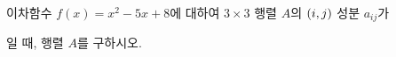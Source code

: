 이차함수 $f(x)=x^2-5x+8$에 대하여 $3\times 3$ 행렬 $A$의 $(i{,}\mkern3mu\mathopen{}j)$ 성분 $a_{ij}$가\par\smallskip{}\par\smallskip\noindent 일 때, 행렬 $A$를 구하시오.
